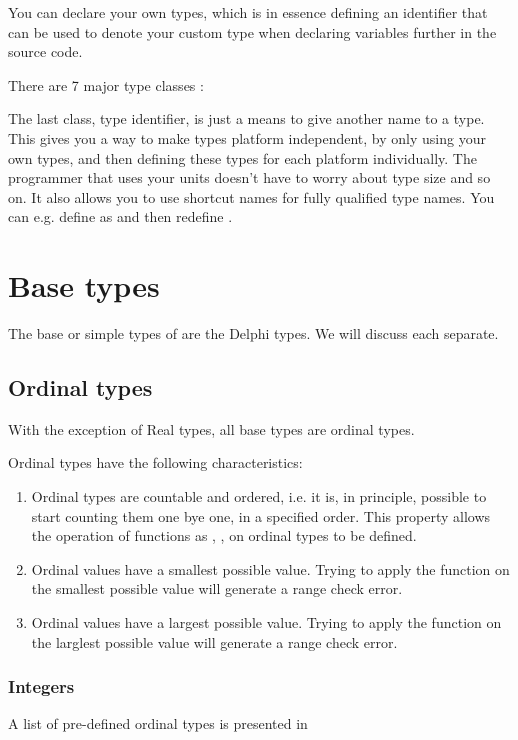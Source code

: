 \documentclass{report}
\begin{document}
You can declare your own types, which is in essence defining an identifier
that can be used to denote your custom type when declaring variables further
in the source code.



There are 7 major type classes :



The last class, {\sffamily type identifier}, is just a means to give another 
name to a type. This gives you a way to make types platform independent, by
only using your own types, and then defining these types for each platform
individually. The programmer that uses your units doesn't have to worry
about type size and so on. It also allows you to use shortcut names for
fully qualified type names. You can e.g. define  as
 and then redefine . 

\section{Base types}
The base or simple types of \fpc are the Delphi types. 
We will discuss each separate. 


\subsection{Ordinal types}
With the exception of Real types, all base types are ordinal types.

Ordinal types have the following characteristics:
\begin{enumerate}
\item Ordinal types are countable and ordered, i.e. it is, in principle,
possible to start counting them one bye one, in a specified order.
This property allows the operation of functions as , , 
on ordinal types to be defined.
\item Ordinal values have a smallest possible value. Trying to apply the
 function on the smallest possible value will generate a range
check error.
\item Ordinal values have a largest possible value. Trying to apply the
 function on the larglest possible value will generate a range
check error.
\end{enumerate}

\subsubsection{Integers}
A list of pre-defined ordinal types is presented in 
\end{document}
